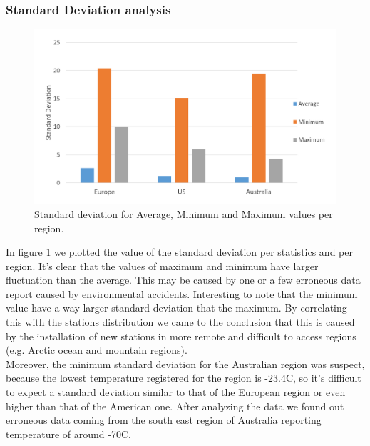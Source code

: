 \documentclass{vldb}
\begin{document}
\subsubsection{Standard Deviation analysis}
\begin{figure}[tbh]
\includegraphics[width=1\linewidth]{stdev}
\caption{Standard deviation for Average, Minimum and Maximum values per region.}
\label{fig:stdev}
\end{figure}
In figure \ref{fig:stdev} we plotted the value of the standard deviation per statistics and per region. It's clear that the values of maximum and minimum have larger fluctuation than the average. This may be caused by one or a few erroneous data report caused by environmental accidents. Interesting to note that the minimum value have a way larger standard deviation that the maximum. By correlating this with the stations distribution we came to the conclusion that this is caused by the installation of new stations in more remote and difficult to access regions (e.g. Arctic ocean and mountain regions). \\
Moreover, the minimum standard deviation for the Australian region was suspect, because the lowest temperature registered for the region is -23.4\degree C\cite{ausTemp}, so it's difficult to expect a standard deviation similar to that of the European region or even higher than that of the American one. After analyzing the data we found out erroneous data coming from the south east region of Australia reporting temperature of around -70\degree C.

\FloatBarrier
\end{document}
